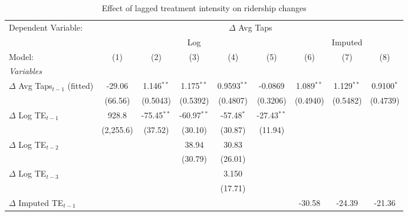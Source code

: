 
\begin{table}[htbp]
   \caption{\label{tab:behaviour_results} Effect of lagged treatment intensity on ridership changes}
   \centering
   \footnotesize
   \begin{tabular}{lcccccccc}
      \tabularnewline \midrule \midrule
      Dependent Variable: & \multicolumn{8}{c}{$\Delta$ Avg Taps}\\
       & \multicolumn{5}{c}{Log} & \multicolumn{3}{c}{Imputed} \\ 
      Model:                                     & (1)       & (2)           & (3)           & (4)           & (5)           & (6)          & (7)          & (8)\\  
      \midrule
      \emph{Variables}\\
      $\Delta$ Avg Taps$_{t-1}$ (fitted)         & -29.06    & 1.146$^{**}$  & 1.175$^{**}$  & 0.9593$^{**}$ & -0.0869       & 1.089$^{**}$ & 1.129$^{**}$ & 0.9100$^{*}$\\   
                                                 & (66.56)   & (0.5043)      & (0.5392)      & (0.4807)      & (0.3206)      & (0.4940)     & (0.5482)     & (0.4739)\\   
      $\Delta$ Log TE$_{t-1}$                    & 928.8     & -75.45$^{**}$ & -60.97$^{**}$ & -57.48$^{*}$  & -27.43$^{**}$ &              &              &   \\   
                                                 & (2,255.6) & (37.52)       & (30.10)       & (30.87)       & (11.94)       &              &              &   \\   
      $\Delta$ Log TE$_{t-2}$                    &           &               & 38.94         & 30.83         &               &              &              &   \\   
                                                 &           &               & (30.79)       & (26.01)       &               &              &              &   \\   
      $\Delta$ Log TE$_{t-3}$                    &           &               &               & 3.150         &               &              &              &   \\   
                                                 &           &               &               & (17.71)       &               &              &              &   \\   
      $\Delta$ Imputed TE$_{t-1}$                &           &               &               &               &               & -30.58       & -24.39       & -21.36\\   

\end{tabular}
\end{table}
